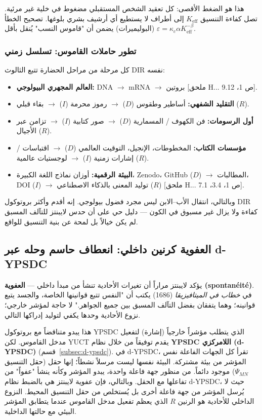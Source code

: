 \documentclass[12pt,a4paper]{article}
\begin{document}
	هذا هو الضغط الأقصى: كل تعقيد الشخص المستقبلي مضغوط في خلية غير مرئية. تصل كفاءة التنسيق \(K_{\mathrm{eff}}\) إلى أطراف لا يستطيع أي أرشيف بشري بلوغها. تصحيح الخطأ (البوليميرات) يضمن أن "قاموس النسب" يُنقل بأقل \(\varepsilon = \kappa_c \alpha K_{\mathrm{eff}}^{-\beta}\).
	
	\subsubsection{تطور حاملات القاموس: تسلسل زمني}
	
	كل مرحلة من مراحل الحضارة تتبع الثالوث DIR نفسه:
	
	\begin{itemize}[leftmargin=*]
		\item \textbf{العالم المجهري البيولوجي:} DNA \(\to\) mRNA \(\to\) بروتين [ملحق H... ص 1، 9.12].
		\item \textbf{التقليد الشفهي:} أساطير وطقوس (\(D\)) \(\to\) رموز محرمة (\(I\)) \(\to\) بقاء قبلي (\(R\)).
		\item \textbf{أول الرسومات:} فن الكهوف / المسمارية (\(D\)) \(\to\) صور كتابية (\(I\)) \(\to\) تزامن عبر الأجيال (\(R\)).
		\item \textbf{مؤسسات الكتاب:} المخطوطات، الإنجيل، التوقيت العالمي (\(D\)) \(\to\) اقتباسات / إشارات زمنية (\(I\)) \(\to\) لوجستيات عالمية (\(R\)).
		\item \textbf{البيئة الرقمية:} أوزان نماذج اللغة الكبيرة، Zenodo، GitHub (\(D\)) \(\to\) المطالبات، DOI (\(I\)) \(\to\) توليد المعنى بالذكاء الاصطناعي (\(R\)) [ملحق H... ص 1، 3.4، 7.1].
	\end{itemize}
	
	وبالتالي، انتقال الأب–الابن ليس مجرد فضول بيولوجي. إنه أقدم وأكثر بروتوكول DIR كفاءة ولا يزال غير مسبوق في الكون — دليل حي على أن حدس لايبنتز للتآلف المسبق لم يكن خيالاً بل لمحة عن بنية التنسيق للواقع.
	
	\subsection{العفوية كرنين داخلي: انعطاف حاسم وحله عبر d-YPSDC}
	
	يؤكد لايبنتز مراراً أن تغيرات الأحادية تنشأ من مبدأ داخلي — \textbf{العفوية (spontanéité)}. في \emph{خطاب في الميتافيزيقا} (1686) يكتب أن "النفس تتبع قوانينها الخاصة، والجسد يتبع قوانينه؛ وهما يتفقان بفضل التآلف المسبق بين جميع الجواهر." لا حاجة لمؤشر خارجي؛ نزوع الأحادية وحدها يكفي لتوليد إدراكها التالي.
	
	هذا يبدو متناقضاً مع بروتوكول YPSDC الذي يتطلب مؤشراً خارجياً (إشارة) لتفعيل مدخل القاموس. لكن YUCT يقدم توفيقاً من خلال نظام \textbf{YPSDC اللامركزي (d-YPSDC)} (قسم~\ref{subsec:d-ypsdc}). في d-YPSDC، تقرأ كل الجهات الفاعلة نفس المؤشر من بيئة مشتركة. البيئة نفسها ليست مرسلاً نشطاً؛ إنها حقل (حقل التنسيق \(\Psi_{MN}\)) موجود دائماً. من منظور جهة فاعلة واحدة، يبدو المؤشر وكأنه ينشأ "عفواً" من تفاعلها مع الحقل. وبالتالي، فإن عفوية لايبنتز هي بالضبط نظام d-YPSDC، حيث لا يُرسل المؤشر من جهة فاعلة أخرى بل يُستخلص من حقل التنسيق المحيط. النزوع الداخلي للأحادية هو الرنين \(R\) الذي يعظم تفعيل مدخل القاموس عندما يتطابق المؤشر البيئي مع حالتها الداخلية.
	
\end{document}
